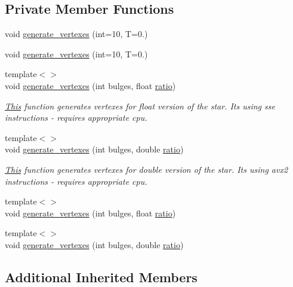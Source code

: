 \subsection*{Private Member Functions}
\begin{DoxyCompactItemize}
\item 
void \mbox{\hyperlink{classStar_ac9ce42a8f7289484594f7f0ab5124849}{generate\+\_\+vertexes}} (int=10, T=0.)
\item 
void \mbox{\hyperlink{classStar_ac9ce42a8f7289484594f7f0ab5124849}{generate\+\_\+vertexes}} (int=10, T=0.)
\item 
{\footnotesize template$<$$>$ }\\void \mbox{\hyperlink{classStar_ab46cbc7aca971bc1c07b8d4afe8fba37}{generate\+\_\+vertexes}} (int bulges, float \mbox{\hyperlink{classStar_a349e0820769da7e4f76aea0ad6002bf8}{ratio}})
\begin{DoxyCompactList}\small\item\em \mbox{\hyperlink{classThis}{This}} function generates vertexes for float version of the star. It\textquotesingle{}s using sse instructions -\/ requires appropriate cpu. \end{DoxyCompactList}\item 
{\footnotesize template$<$$>$ }\\void \mbox{\hyperlink{classStar_a85d8438cea72701a136b76f046ee95dd}{generate\+\_\+vertexes}} (int bulges, double \mbox{\hyperlink{classStar_a349e0820769da7e4f76aea0ad6002bf8}{ratio}})
\begin{DoxyCompactList}\small\item\em \mbox{\hyperlink{classThis}{This}} function generates vertexes for double version of the star. It\textquotesingle{}s using avx2 instructions -\/ requires appropriate cpu. \end{DoxyCompactList}\item 
{\footnotesize template$<$$>$ }\\void \mbox{\hyperlink{classStar_ab46cbc7aca971bc1c07b8d4afe8fba37}{generate\+\_\+vertexes}} (int bulges, float \mbox{\hyperlink{classStar_a349e0820769da7e4f76aea0ad6002bf8}{ratio}})
\item 
{\footnotesize template$<$$>$ }\\void \mbox{\hyperlink{classStar_a85d8438cea72701a136b76f046ee95dd}{generate\+\_\+vertexes}} (int bulges, double \mbox{\hyperlink{classStar_a349e0820769da7e4f76aea0ad6002bf8}{ratio}})
\end{DoxyCompactItemize}
\subsection*{Additional Inherited Members}


